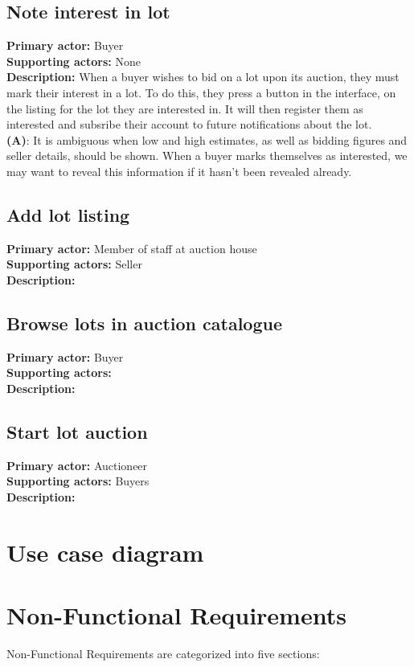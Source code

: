 \documentclass[titlepage, 12pt]{extarticle}
\begin{document}
\subsection{Note interest in lot}
{\bf Primary actor: } Buyer
\\{\bf Supporting actors: } None
\\{\bf Description: } When a buyer wishes to bid on a lot upon its auction, they must mark their interest in a lot. To do this, they press a button in the interface, on the listing for the lot they are interested in. It will then register them as interested and subsribe their account to future notifications about the lot.
\\{\bf (A)}: It is ambiguous when low and high estimates, as well as bidding figures and seller details, should be shown. When a buyer marks themselves as interested, we may want to reveal this information if it hasn't been revealed already.
\subsection{Add lot listing}
{\bf Primary actor: } Member of staff at auction house
\\{\bf Supporting actors: } Seller
\\{\bf Description: } 
\subsection{Browse lots in auction catalogue}
{\bf Primary actor: } Buyer
\\{\bf Supporting actors: }
\\{\bf Description: } 
\subsection{Start lot auction}
{\bf Primary actor: } Auctioneer
\\{\bf Supporting actors: } Buyers
\\{\bf Description: }

\section{Use case diagram}

\section{Non-Functional Requirements}
Non-Functional Requirements are categorized into five sections:
\end{document}

